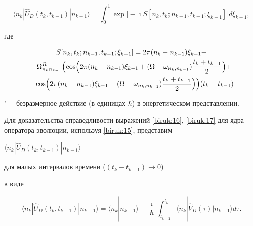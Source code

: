 \begin{equation}

\langle n_k| \hat{U}_D(t_{k},t_{k-1})| n_{k-1}\rangle = \int_{0}^{1} \exp\bigl[-\imath S[n_k,t_k;n_{k-1},t_{k-1};\xi_{k-1}]\bigr]d\xi_{k-1},

\label{biruk:16}

\end{equation}

где

\begin{multline}

\label{biruk:17}

S[n_k,t_k;n_{k-1},t_{k-1};\xi_{k-1}]=2\pi (n_k-n_{k-1})\xi_{k-1}

+ \\

+

\Omega_{n_k n_{k-1}}^R

\Bigl(\cos\Bigl(2\pi (n_k-n_{k-1})\xi_{k-1}+(\Omega+\omega_{n_k,n_{k-1}})\frac{t_{k}+t_{k-1}}{2} \Bigr)

+

\\

+

\cos\Bigl(2\pi (n_k-n_{k-1})\xi_{k-1}-(\Omega-\omega_{n_k,n_{k-1}})\frac{t_{k}+t_{k-1}}{2}\Bigr)\Bigr)(t_{k}-t_{k-1}) \end{multline}

"--- безразмерное действие (в единицах $\hbar$) в энергетическом представлении.



Для доказательства справедливости выражений \eqref{biruk:16}, \eqref{biruk:17} для ядра оператора эволюции, используя \eqref{biruk:15}, представим 

$\langle n_k| \hat{U}_D(t_{k},t_{k-1})| n_{k-1}\rangle$ 

для малых интервалов времени ($(t_k-t_{k-1})\rightarrow 0$) 

в виде

\begin{equation}

\label{biruk:18}

\langle n_k| \hat{U}_D(t_{k},t_{k-1})| n_{k-1}\rangle

=

\langle n_k|n_{k-1}\rangle-\frac{\imath}{\hbar}\int_{t_{k-1}}^{t_{k}}\langle n_k |\hat{V}_D(\tau)|n_{k-1}\rangle d\tau. 

\end{equation}







